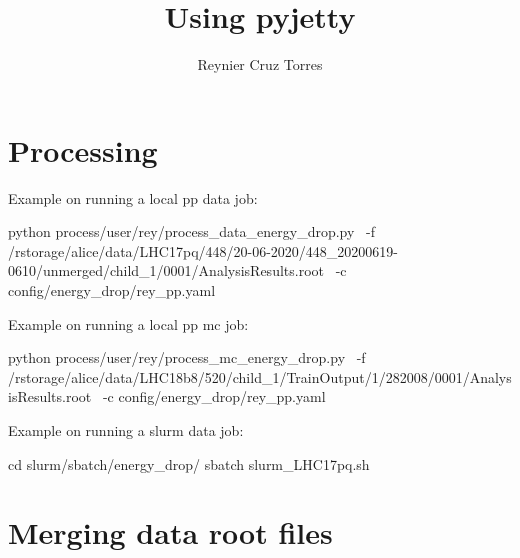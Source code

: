 \documentclass[12pt]{article}
\title{Using pyjetty}
\author{Reynier Cruz Torres}
\begin{document}
\maketitle

\tableofcontents

\newpage
\section{Processing}

Example on running a local pp data job:

\begin{tcolorbox}
\begin{verbnobox}[\scriptsize]
python process/user/rey/process_data_energy_drop.py \
-f /rstorage/alice/data/LHC17pq/448/20-06-2020/448_20200619-0610/unmerged/child_1/0001/AnalysisResults.root \
-c config/energy_drop/rey_pp.yaml
\end{verbnobox}  
\end{tcolorbox}

Example on running a local pp mc job:
\begin{tcolorbox}
\begin{verbnobox}[\scriptsize]
python process/user/rey/process_mc_energy_drop.py \
-f /rstorage/alice/data/LHC18b8/520/child_1/TrainOutput/1/282008/0001/AnalysisResults.root \
-c config/energy_drop/rey_pp.yaml
\end{verbnobox}  
\end{tcolorbox}

Example on running a slurm data job:
\begin{tcolorbox}
\begin{verbnobox}[\scriptsize]
cd slurm/sbatch/energy_drop/
sbatch slurm_LHC17pq.sh
\end{verbnobox}  
\end{tcolorbox}

\section{Merging data root files}
\end{document}
